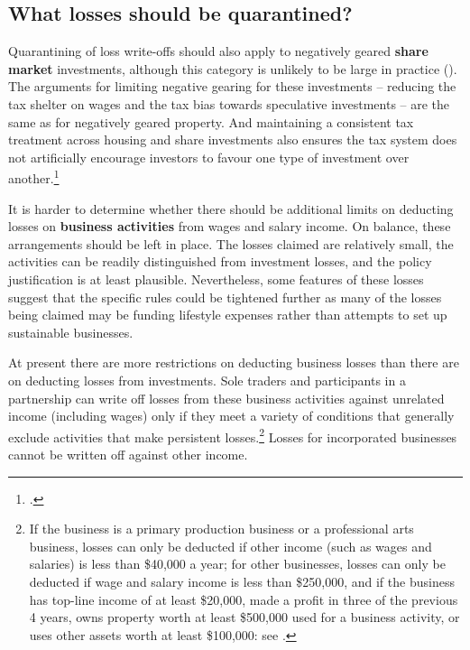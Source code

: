 \documentclass{grattanAlpha}\usepackage[]{graphicx}\usepackage[]{color}
\begin{document}
\subsection{What losses should be quarantined?}
Quarantining of loss write-offs should also apply to negatively geared \textbf{share market} investments, although this category is unlikely to be large in practice (). The arguments for limiting negative gearing for these investments – reducing the tax shelter on wages and the tax bias towards speculative investments – are the same as for negatively geared property. And maintaining a consistent tax treatment across housing and share investments also ensures the tax system does not artificially encourage investors to favour one type of investment over another.\footcite[][133]{Commission2004a}  

It is harder to determine whether there should be additional limits on deducting losses on \textbf{business activities} from wages and salary income.  On balance, these arrangements should be left in place. The losses claimed are relatively small, the activities can be readily distinguished from investment losses, and the policy justification is at least plausible. Nevertheless, some features of these losses suggest that the specific rules could be tightened further as many of the losses being claimed may be funding lifestyle expenses rather than attempts to set up sustainable businesses. 

At present there are more restrictions on deducting business losses than there are on deducting losses from investments. Sole traders and participants in a partnership can write off losses from these business activities against unrelated income (including wages) only if they meet a variety of conditions that generally exclude activities that make persistent losses.\footnote{If the business is a primary production business or a professional arts business, losses can only be deducted if other income (such as wages and salaries) is less than \$40,000 a year; for other businesses, losses can only be deducted if wage and salary income is less than \$250,000, and if the business has top-line income of at least \$20,000, made a profit in three of the previous 4 years, owns property worth at least \$500,000 used for a business activity, or uses other assets worth at least \$100,000: see \textcite{ATO2015OffsettingCurrentYearLosses}.} Losses for incorporated businesses cannot be written off against other income. 
\end{document}
